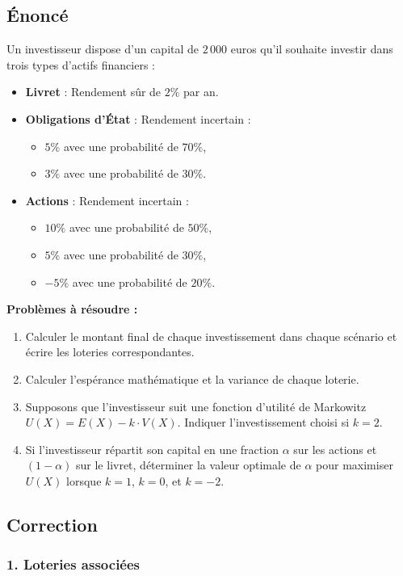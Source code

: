 \documentclass[12pt,a4paper]{article}
\begin{document}
\subsection{Énoncé}
Un investisseur dispose d’un capital de \(2\,000\) euros qu’il souhaite investir dans trois types d’actifs financiers :
\begin{itemize}
	\item \textbf{Livret} : Rendement sûr de \(2\%\) par an.
	\item \textbf{Obligations d’État} : Rendement incertain :
	\begin{itemize}
		\item \(5\%\) avec une probabilité de \(70\%\),
		\item \(3\%\) avec une probabilité de \(30\%\).
	\end{itemize}
	\item \textbf{Actions} : Rendement incertain :
	\begin{itemize}
		\item \(10\%\) avec une probabilité de \(50\%\),
		\item \(5\%\) avec une probabilité de \(30\%\),
		\item \(-5\%\) avec une probabilité de \(20\%\).
	\end{itemize}
\end{itemize}

\textbf{Problèmes à résoudre :}
\begin{enumerate}
	\item Calculer le montant final de chaque investissement dans chaque scénario et écrire les loteries correspondantes.
	\item Calculer l’espérance mathématique et la variance de chaque loterie.
	\item Supposons que l’investisseur suit une fonction d’utilité de Markowitz \(U(X) = E(X) - k \cdot V(X)\). Indiquer l’investissement choisi si \(k = 2\).
	\item Si l’investisseur répartit son capital en une fraction \(\alpha\) sur les actions et \((1-\alpha)\) sur le livret, déterminer la valeur optimale de \(\alpha\) pour maximiser \(U(X)\) lorsque \(k = 1\), \(k = 0\), et \(k = -2\).
\end{enumerate}

\subsection{Correction}

\subsubsection*{1. Loteries associées}
\end{document}
